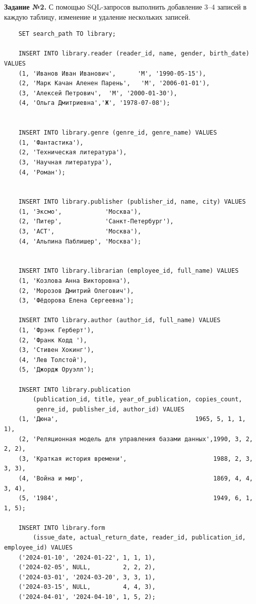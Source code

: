    \textbf{Задание №2.} С помощью SQL-запросов выполнить добавление 3–4 записей в каждую таблицу, изменение и удаление нескольких записей.\label{sec:2} 

    \begin{verbatim}
    SET search_path TO library;

    INSERT INTO library.reader (reader_id, name, gender, birth_date) VALUES
    (1, 'Иванов Иван Иванович',      'М', '1990-05-15'),
    (2, 'Марк Качан Аленен Парень',   'М', '2006-01-01'),
    (3, 'Алексей Петрович',  'М', '2000-01-30'),
    (4, 'Ольга Дмитриевна','Ж', '1978-07-08');
    
    
    INSERT INTO library.genre (genre_id, genre_name) VALUES
    (1, 'Фантастика'),
    (2, 'Техническая литература'),
    (3, 'Научная литература'),
    (4, 'Роман');
    
    
    INSERT INTO library.publisher (publisher_id, name, city) VALUES
    (1, 'Эксмо',            'Москва'),
    (2, 'Питер',            'Санкт-Петербург'),
    (3, 'АСТ',              'Москва'),
    (4, 'Альпина Паблишер', 'Москва');
    
    
    INSERT INTO library.librarian (employee_id, full_name) VALUES
    (1, 'Козлова Анна Викторовна'),
    (2, 'Морозов Дмитрий Олегович'),
    (3, 'Фёдорова Елена Сергеевна');
    
    INSERT INTO library.author (author_id, full_name) VALUES
    (1, 'Фрэнк Герберт'),
    (2, 'Франк Кодд '),
    (3, 'Стивен Хокинг'),
    (4, 'Лев Толстой'),
    (5, 'Джордж Оруэлл');
    
    INSERT INTO library.publication
        (publication_id, title, year_of_publication, copies_count,
         genre_id, publisher_id, author_id) VALUES
    (1, 'Дюна',                          	         1965, 5, 1, 1, 1),
    (2, 'Реляционная модель для управления базами данных',1990, 3, 2, 2, 2),
    (3, 'Краткая история времени',                        1988, 2, 3, 3, 3),
    (4, 'Война и мир',                                    1869, 4, 4, 3, 4),
    (5, '1984',                                           1949, 6, 1, 1, 5);
    
    INSERT INTO library.form
        (issue_date, actual_return_date, reader_id, publication_id, employee_id) VALUES
    ('2024-01-10', '2024-01-22', 1, 1, 1),
    ('2024-02-05', NULL,         2, 2, 2),
    ('2024-03-01', '2024-03-20', 3, 3, 1),
    ('2024-03-15', NULL,         4, 4, 3),
    ('2024-04-01', '2024-04-10', 1, 5, 2);
    

\end{verbatim}
